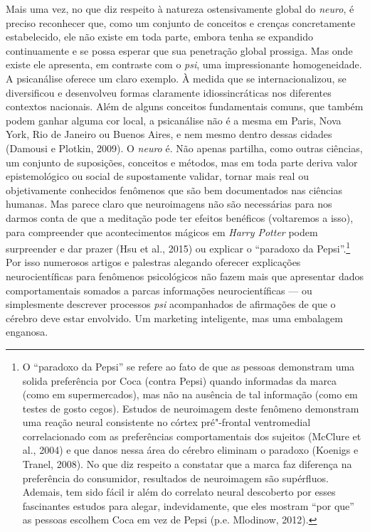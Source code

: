 Mais uma vez, no que diz respeito à natureza ostensivamente global do
\emph{neuro}, é preciso reconhecer que, como um conjunto de conceitos e
crenças concretamente estabelecido, ele não existe em toda parte, embora
tenha se expandido continuamente e se possa esperar que sua penetração
global prossiga. Mas onde existe ele apresenta, em contraste com o
\emph{psi}, uma impressionante homogeneidade. A psicanálise oferece um
claro exemplo. À medida que se internacionalizou, se diversificou e
desenvolveu formas claramente idiossincráticas nos diferentes contextos
nacionais. Além de alguns conceitos fundamentais comuns, que também
podem ganhar alguma cor local, a psicanálise não é a mesma em Paris,
Nova York, Rio de Janeiro ou Buenos Aires, e nem mesmo dentro dessas
cidades (Damousi e Plotkin, 2009). O \emph{neuro} é. Não apenas
partilha, como outras ciências, um conjunto de suposições, conceitos e
métodos, mas em toda parte deriva valor epistemológico ou social de
supostamente validar, tornar mais real ou objetivamente conhecidos
fenômenos que são bem documentados nas ciências humanas. Mas parece
claro que neuroimagens não são necessárias para nos darmos conta de que
a meditação pode ter efeitos benéficos (voltaremos a isso), para
compreender que acontecimentos mágicos em \emph{Harry Potter} podem
surpreender e dar prazer (Hsu et al., 2015) ou explicar o ``paradoxo da
Pepsi''.\footnote{O ``paradoxo da Pepsi'' se refere ao fato de que as pessoas
demonstram uma solida preferência por Coca (contra Pepsi) quando
informadas da marca (como em supermercados), mas não na ausência de tal
informação (como em testes de gosto cegos). Estudos de neuroimagem deste
fenômeno demonstram uma reação neural consistente no córtex pré"-frontal
ventromedial correlacionado com as preferências comportamentais dos
sujeitos (McClure et al., 2004) e que danos nessa área do cérebro
eliminam o paradoxo (Koenigs e Tranel, 2008). No que diz respeito a
constatar que a marca faz diferença na preferência do consumidor,
resultados de neuroimagem são supérfluos. Ademais, tem sido fácil ir
além do correlato neural descoberto por esses fascinantes estudos para
alegar, indevidamente, que eles mostram ``por que'' as pessoas escolhem
Coca em vez de Pepsi (p.e. Mlodinow, 2012).} Por isso numerosos artigos e palestras
alegando oferecer explicações neurocientíficas para fenômenos
psicológicos não fazem mais que apresentar dados comportamentais somados
a parcas informações neurocientíficas --- ou simplesmente descrever
processos \emph{psi} acompanhados de afirmações de que o cérebro deve
estar envolvido. Um marketing inteligente, mas uma embalagem enganosa.


